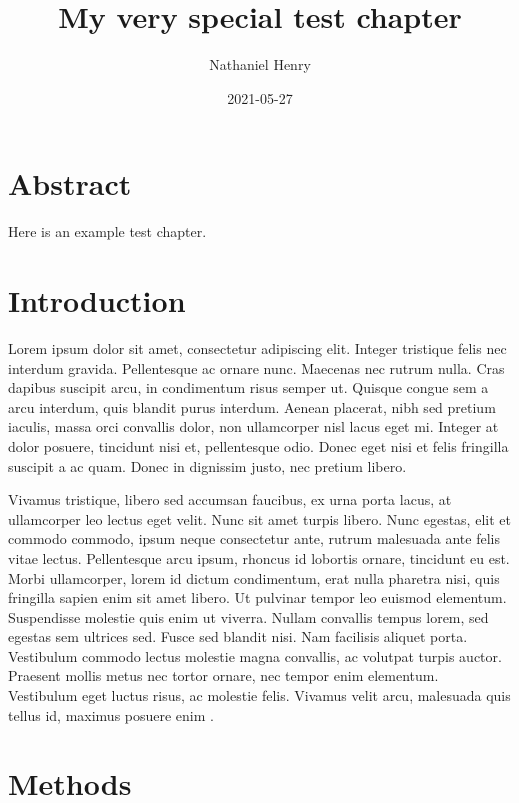 \documentclass[
]{article}
\title{My very special test chapter}
\author{Nathaniel Henry}
\date{2021-05-27}
\begin{document}
\maketitle

\hypertarget{abstract}{%
\section{Abstract}\label{abstract}}

Here is an example test chapter.

\hypertarget{introduction}{%
\section{Introduction}\label{introduction}}

Lorem ipsum dolor sit amet, consectetur adipiscing elit. Integer tristique felis nec
interdum gravida. Pellentesque ac ornare nunc. Maecenas nec rutrum nulla. Cras dapibus
suscipit arcu, in condimentum risus semper ut. Quisque congue sem a arcu interdum, quis
blandit purus interdum. Aenean placerat, nibh sed pretium iaculis, massa orci convallis
dolor, non ullamcorper nisl lacus eget mi. Integer at dolor posuere, tincidunt nisi et,
pellentesque odio. Donec eget nisi et felis fringilla suscipit a ac quam. Donec in
dignissim justo, nec pretium libero.

Vivamus tristique, libero sed accumsan faucibus, ex urna porta lacus, at ullamcorper leo
lectus eget velit. Nunc sit amet turpis libero. Nunc egestas, elit et commodo commodo,
ipsum neque consectetur ante, rutrum malesuada ante felis vitae lectus. Pellentesque arcu
ipsum, rhoncus id lobortis ornare, tincidunt eu est. Morbi ullamcorper, lorem id dictum
condimentum, erat nulla pharetra nisi, quis fringilla sapien enim sit amet libero. Ut
pulvinar tempor leo euismod elementum. Suspendisse molestie quis enim ut viverra. Nullam
convallis tempus lorem, sed egestas sem ultrices sed. Fusce sed blandit nisi. Nam
facilisis aliquet porta. Vestibulum commodo lectus molestie magna convallis, ac volutpat
turpis auctor. Praesent mollis metus nec tortor ornare, nec tempor enim elementum.
Vestibulum eget luctus risus, ac molestie felis. Vivamus velit arcu, malesuada quis tellus
id, maximus posuere enim \autocite{Aalbers2014,Aalbers}.

\hypertarget{methods}{%
\section{Methods}\label{methods}}
\end{document}
